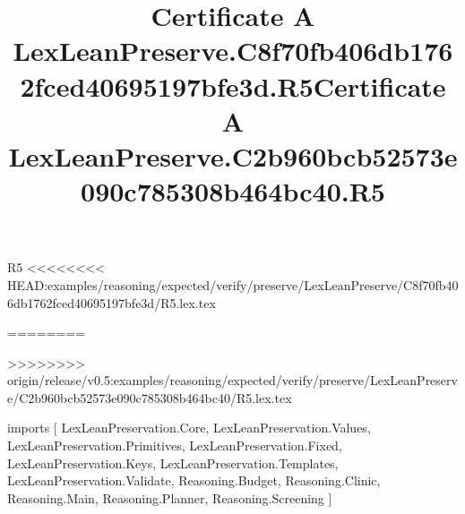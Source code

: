 \begin{lexlean}{R5}
<<<<<<<< HEAD:examples/reasoning/expected/verify/preserve/LexLeanPreserve/C8f70fb406db1762fced40695197bfe3d/R5.lex.tex
\title{Certificate A LexLeanPreserve.C8f70fb406db1762fced40695197bfe3d.R5}
========
\title{Certificate A LexLeanPreserve.C2b960bcb52573e090c785308b464bc40.R5}
>>>>>>>> origin/release/v0.5:examples/reasoning/expected/verify/preserve/LexLeanPreserve/C2b960bcb52573e090c785308b464bc40/R5.lex.tex
\begin{coremodule}
imports [
  LexLeanPreservation.Core,
  LexLeanPreservation.Values,
  LexLeanPreservation.Primitives,
  LexLeanPreservation.Fixed,
  LexLeanPreservation.Keys,
  LexLeanPreservation.Templates,
  LexLeanPreservation.Validate,
  Reasoning.Budget,
  Reasoning.Clinic,
  Reasoning.Main,
  Reasoning.Planner,
  Reasoning.Screening
]


\end{coremodule}
\end{lexlean}
